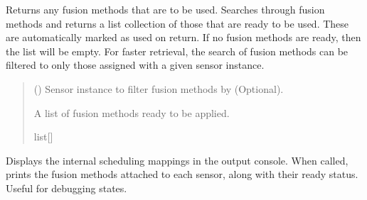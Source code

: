 \documentclass[letterpaper,10pt,english]{sphinxmanual}
\begin{document}
\begin{fulllineitems}
\begin{fulllineitems}
\label{\detokenize{modules/simulation/scheduling:qnav.simulation.scheduling.TimingHandler.get_next_fusion}}
\pysigstartsignatures
{}
\pysigstopsignatures
\sphinxAtStartPar
Returns any fusion methods that are to be used.
Searches through fusion methods and returns a list collection of those
that are ready to be used. These are automatically marked as used on
return. If no fusion methods are ready, then the list will be empty.
For faster retrieval, the search of fusion methods can be filtered
to only those assigned with a given sensor instance.
\begin{quote}\begin{description}
\sphinxAtStartPar
{} ({\hyperref[\detokenize{modules/measurement/sensor:qnav.measurement.sensor.Sensor}]{}}) \textendash{} Sensor instance to filter fusion methods by (Optional).

\sphinxAtStartPar
A list of fusion methods ready to be applied.

\sphinxAtStartPar
list{[}{\hyperref[\detokenize{modules/measurement/sensor:qnav.measurement.sensor.SensorFusion}]{}}{]}

\end{description}\end{quote}

\end{fulllineitems}


\begin{fulllineitems}
\label{\detokenize{modules/simulation/scheduling:qnav.simulation.scheduling.TimingHandler.print_mappings}}
\pysigstartsignatures
{}
\pysigstopsignatures
\sphinxAtStartPar
Displays the internal scheduling mappings in the output console.
When called, prints the fusion methods attached to each sensor,
along with their ready status. Useful for debugging states.

\end{fulllineitems}


\end{fulllineitems}
\end{document}
